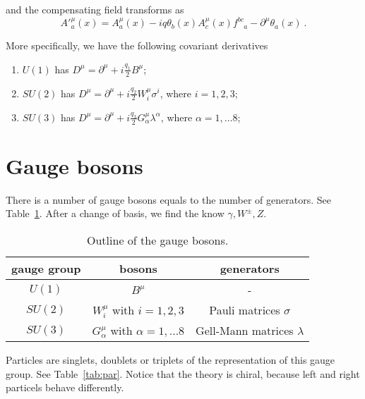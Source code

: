     and the compensating field transforms as 
    \begin{equation*}
        A'^\mu_a (x) = A^\mu_a (x) - i q \theta_b (x) A^\mu_c (x) f^{bc}_{\phantom{bc} a} - \partial^\mu \theta_a (x) ~.
    \end{equation*}

    More specifically, we have the following covariant derivatives 
    \begin{enumerate}
        \item $U(1)$ has $D^\mu = \partial^\mu + i \frac{q_1}{2} B^\mu$; 
        \item $SU(2)$ has $D^\mu = \partial^\mu + i \frac{q_2}{2} W^\mu_i \sigma^i$, where $i = 1,2,3$;
        \item $SU(3)$ has $D^\mu = \partial^\mu + i \frac{q_3}{2} G^\mu_\alpha \lambda^\alpha$, where $\alpha = 1, \ldots 8$;
    \end{enumerate}

\section{Gauge bosons}
    
    There is a number of gauge bosons equals to the number of generators. See Table~\ref{tab:bos}. After a change of basis, we find the know $\gamma, W^\pm, Z$.
    
    \begin{table}[h!]
        \centering
        \begin{tabular}{c | c | c}
            gauge group & bosons & generators \\
            \hline
            $U(1)$ & $B^\mu$ & - \\ 
            $SU(2)$ & $W^\mu_i$ with $i = 1, 2, 3$ & Pauli matrices $\sigma$ \\ 
            $SU(3)$ & $G^\mu_\alpha$ with $\alpha = 1, \ldots 8$ & Gell-Mann matrices $\lambda$ \\ 
        \end{tabular}
        \caption{Outline of the gauge bosons.}
        \label{tab:bos}
    \end{table}

    Particles are singlets, doublets or triplets of the representation of this gauge group. See Table~\ref{tab:par}. Notice that the theory is chiral, because left and right particels behave differently.

